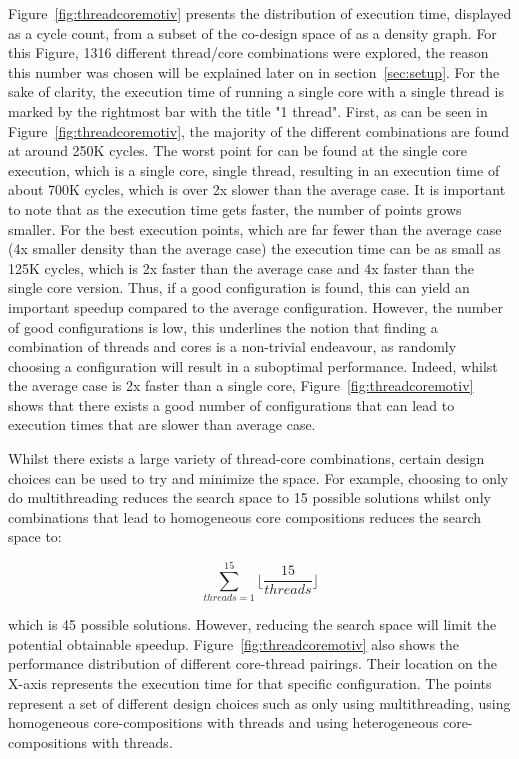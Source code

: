 Figure~\ref{fig:threadcoremotiv} presents the distribution of execution time, displayed as a cycle count, from a subset of the co-design space of  as a density graph.
For this Figure, 1316 different thread/core combinations were explored, the reason this number was chosen will be explained later on in section~\ref{sec:setup}.
For the sake of clarity, the execution time of running a single core with a single thread is marked by the rightmost bar with the title "1 thread".
First, as can be seen in Figure~\ref{fig:threadcoremotiv}, the majority of the different combinations are found at around 250K cycles.
The worst point for  can be found at the single core execution, which is a single core, single thread, resulting in an execution time of about 700K cycles, which is over 2x slower than the average case.
It is important to note that as the execution time gets faster, the number of points grows smaller.
For the best execution points, which are far fewer than the average case (4x smaller density than the average case) the execution time can be as small as 125K cycles, which is 2x faster than the average case and 4x faster than the single core version.
Thus, if a good configuration is found, this can yield an important speedup compared to the average configuration.
However, the number of good configurations is low, this underlines the notion that finding a combination of threads and cores is a non-trivial endeavour, as randomly choosing a configuration will result in a suboptimal performance.
Indeed, whilst the average case is 2x faster than a single core, Figure~\ref{fig:threadcoremotiv} shows that there exists a good number of configurations that can lead to execution times that are slower than average case.

Whilst there exists a large variety of thread-core combinations, certain design choices can be used to try and minimize the space.
For example, choosing to only do multithreading reduces the search space to 15 possible solutions whilst only combinations that lead to homogeneous core compositions reduces the search space to:

\begin{equation}
\sum_{threads=1}^{15} \lfloor\frac{15}{threads}\rfloor
\end{equation}

which is 45 possible solutions.
However, reducing the search space will limit the potential obtainable speedup.
Figure~\ref{fig:threadcoremotiv} also shows the performance distribution of different core-thread pairings.
Their location on the X-axis represents the execution time for that specific configuration.
The points represent a set of different design choices such as only using multithreading, using homogeneous core-compositions with threads and using heterogeneous core-compositions with threads.

